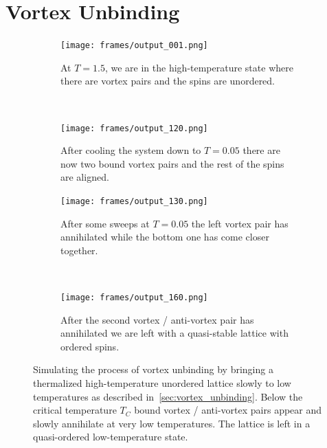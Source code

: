 \section{Vortex Unbinding}\label{app:vortex_unbinding}
\begin{figure}[H]
	\centering
	\begin{subfigure}[h]{0.45\textwidth}
		\centering
		\texttt{[image: frames/output\_001.png]}
		\caption{At $T=\num{1.5}$, we are in the high-temperature state where there are vortex pairs and the spins are unordered.}
	\end{subfigure}
	~
	\begin{subfigure}[h]{0.45\textwidth}
		\centering
		\texttt{[image: frames/output\_120.png]}
		\caption{After cooling the system down to $T=\num{0.05}$ there are now two bound vortex pairs and the rest of the spins are aligned.}
	\end{subfigure}
	\begin{subfigure}[h]{0.45\textwidth}
		\centering
		\texttt{[image: frames/output\_130.png]}
		\caption{After some sweeps at $T=\num{0.05}$ the left vortex pair has annihilated while the bottom one has come closer together.}
	\end{subfigure}
	~
	\begin{subfigure}[h]{0.45\textwidth}
		\centering
		\texttt{[image: frames/output\_160.png]}
		\caption{After the second vortex / anti-vortex pair has annihilated we are left with a quasi-stable lattice with ordered spins.}
	\end{subfigure}
	\caption[Vortex unbiding of vortex / antivortex pairs at low temperatures.]{Simulating the process of vortex unbinding by bringing a thermalized high-temperature unordered lattice slowly to low temperatures as described in~\cref{sec:vortex_unbinding}. Below the critical temperature $T_C$ bound vortex / anti-vortex pairs appear and slowly annihilate at very low temperatures. The lattice is left in a quasi-ordered low-temperature state.}
	\label{fig:vortex_unbinding}
\end{figure}